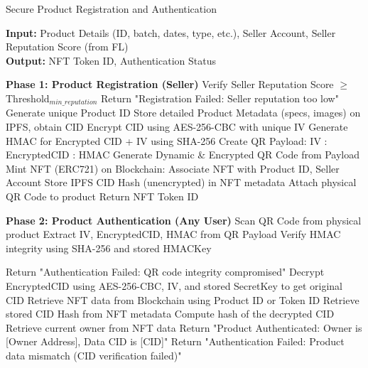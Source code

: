 \documentclass[conference]{IEEEtran}
\begin{document}
\begin{algorithm}[H]

\caption{Secure Product Registration and Authentication}
\textbf{Input:} Product Details (ID, batch, dates, type, etc.), Seller Account, Seller Reputation Score (from FL) \\
\textbf{Output:} NFT Token ID, Authentication Status
\begin{algorithmic}[1]
\STATE \textbf{Phase 1: Product Registration (Seller)}
\STATE Verify Seller Reputation Score $\geq$ Threshold$_{min\_reputation}$
    \STATE Return "Registration Failed: Seller reputation too low"
\ENDIF
\STATE Generate unique Product ID
\STATE Store detailed Product Metadata (specs, images) on IPFS, obtain CID
\STATE Encrypt CID using AES-256-CBC with unique IV
\STATE Generate HMAC for Encrypted CID + IV using SHA-256
\STATE Create QR Payload: IV : EncryptedCID : HMAC
\STATE Generate Dynamic \& Encrypted QR Code from Payload
\STATE Mint NFT (ERC721) on Blockchain:
    \STATE \quad Associate NFT with Product ID, Seller Account
    \STATE \quad Store IPFS CID Hash (unencrypted) in NFT metadata
\STATE Attach physical QR Code to product
\STATE Return NFT Token ID

\STATE \textbf{Phase 2: Product Authentication (Any User)}
\STATE Scan QR Code from physical product
\STATE Extract IV, EncryptedCID, HMAC from QR Payload
\STATE Verify HMAC integrity using SHA-256 and stored HMACKey

    \STATE Return "Authentication Failed: QR code integrity compromised"
\ENDIF
\STATE Decrypt EncryptedCID using AES-256-CBC, IV, and stored SecretKey to get original CID
\STATE Retrieve NFT data from Blockchain using Product ID or Token ID
\STATE Retrieve stored CID Hash from NFT metadata
\STATE Compute hash of the decrypted CID
    \STATE Retrieve current owner from NFT data
    \STATE Return "Product Authenticated: Owner is [Owner Address], Data CID is [CID]"
\ELSE
    \STATE Return "Authentication Failed: Product data mismatch (CID verification failed)"
\ENDIF
\end{algorithmic}
\end{algorithm}
\end{document}
